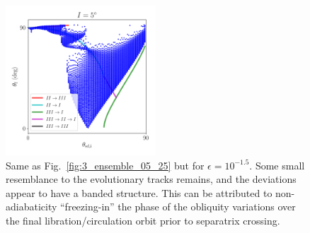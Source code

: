 \documentclass[
        fleqn,
        usenatbib,
    ]{mnras}
\begin{document}
\begin{figure}
    \centering
    \includegraphics[width=0.5\textwidth]{plots_diskdisp/3_ensemble_05_15.png}
    \caption{Same as Fig.~\ref{fig:3_ensemble_05_25} but for $\epsilon =
    10^{-1.5}$. Some small resemblance to the evolutionary tracks remains, and
    the deviations appear to have a banded structure. This can be attributed to
    non-adiabaticity ``freezing-in'' the phase of the obliquity variations over
    the final libration/circulation orbit prior to separatrix
    crossing.}\label{fig:3_ensemble_05_15}
\end{figure}
\end{document}
